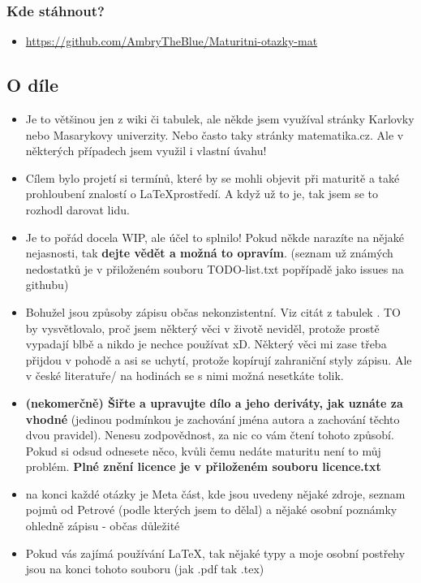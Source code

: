 \documentclass[12pt]{article}
\begin{document}
\subsubsection{Kde stáhnout?}
\begin{itemize}
\item \url{https://github.com/AmbryTheBlue/Maturitni-otazky-mat}

\end{itemize}
\subsection{O díle}
\begin{itemize}
\item Je to většinou jen z wiki či tabulek, ale někde jsem využíval stránky Karlovky nebo Masarykovy univerzity. Nebo často taky stránky matematika.cz. Ale v některých případech jsem využil i vlastní úvahu!
\item Cílem bylo projetí si termínů, které by se mohli objevit při maturitě a také prohloubení znalostí o \LaTeX prostředí. A když už to je, tak jsem se to rozhodl darovat lidu.
\item Je to pořád docela WIP, ale účel to splnilo! Pokud někde narazíte na nějaké nejasnosti, tak \textbf{dejte vědět a možná to opravím}. (seznam už známých nedostatků je v  přiloženém souboru TODO-list.txt popřípadě jako issues na githubu)
\item Bohužel jsou způsoby zápisu občas nekonzistentní. Viz citát z tabulek . TO by vysvětlovalo, proč jsem některý věci v životě neviděl, protože prostě vypadají blbě a nikdo je nechce používat xD. Některý věci mi zase třeba přijdou v pohodě a asi se uchytí, protože kopírují zahraniční styly zápisu. Ale v české literatuře/ na hodinách se s nimi možná nesetkáte tolik.
\item \textbf{(nekomerčně) Šiřte a upravujte dílo a jeho deriváty, jak uznáte za vhodné} (jedinou podmínkou je zachování jména autora a zachování těchto dvou pravidel). Nenesu zodpovědnost, za nic co vám čtení tohoto způsobí. Pokud si odsud odnesete něco, kvůli čemu nedáte maturitu není to můj problém.
\textbf{Plné znění licence je v přiloženém souboru licence.txt}
\item na konci každé otázky je Meta část, kde jsou uvedeny nějaké zdroje, seznam pojmů od Petrové (podle kterých jsem to dělal) a nějaké osobní poznámky ohledně zápisu - občas důležité
\item Pokud vás zajímá používání \LaTeX , tak nějaké typy a moje osobní postřehy jsou na konci tohoto souboru (jak .pdf tak .tex) %
\end{itemize}
\end{document}

